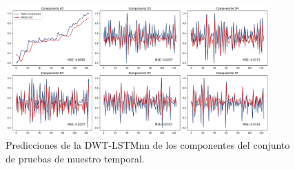 \begin{figure}[H]
    \centering
    \includegraphics[width=0.9\textwidth]{Figuras/proceso_de_entrenamiento/grafs_c_prueba/DWT_LSTM/estandar/DWT_LSTM.png}
    \caption{Predicciones de la DWT-LSTMnn de los componentes del conjunto de pruebas de muestro temporal.} 
    \label{fig:c_prueba_componentes_DWT_LSTM}
\end{figure}

